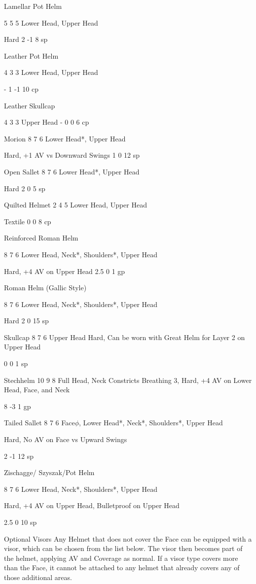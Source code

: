 \documentclass[oneside,11pt,english]{book}
\begin{document}
Lamellar Pot 
Helm 

5 5 5 Lower Head, Upper 
Head 

Hard 2 -1 8 sp 


Leather Pot 
Helm 

4 3 3 Lower Head, Upper 
Head 

- 1 -1 10 
cp 

Leather 
Skullcap 

4 3 3 Upper Head - 0 0 6 cp 

Morion 8 7 6 Lower Head*, Upper 
Head 

Hard, +1 AV vs Downward Swings 1 0 12 
sp 

Open Sallet 8 7 6 Lower Head*, Upper 
Head 

Hard 2 0 5 sp 

Quilted Helmet 2 4 5 Lower Head, Upper 
Head 

Textile 0 0 8 cp 

Reinforced 
Roman Helm 

8 7 6 Lower Head, Neck*, 
Shoulders*, Upper 
Head 

Hard, +4 AV on Upper Head 2.5 0 1 gp 

Roman Helm 
(Gallic Style) 

8 7 6 Lower Head, Neck*, 
Shoulders*, Upper 
Head 

Hard 2 0 15 
sp 

Skullcap 8 7 6 Upper Head Hard, Can be worn with Great Helm 
for Layer 2 on Upper Head 

0 0 1 sp 

Stechhelm 10 9 8 Full Head, Neck Constricts Breathing 3, Hard, +4 AV 
on Lower Head, Face, and Neck 

8 -3 1 gp 

Tailed Sallet 8 7 6 Face$\phi$, Lower Head*, 
Neck*, Shoulders*, 
Upper Head 

Hard, No AV on Face vs Upward 
Swings 

2 -1 12 
sp 

Zischagge/ 
Szyszak/Pot 
Helm 

 

 

 

8 7 6 Lower Head, Neck*, 
Shoulders*, Upper 
Head 

Hard, +4 AV on Upper Head, 
Bulletproof on Upper Head 

2.5 0 10 
sp 

 
Optional Visors 
Any Helmet that does not cover the Face can be equipped with a visor, which can be chosen from the list 
below. The visor then becomes part of the helmet, applying AV and Coverage as normal. If a visor type 
covers more than the Face, it cannot be attached to any helmet that already covers any of those additional 
areas. 
\end{document}
